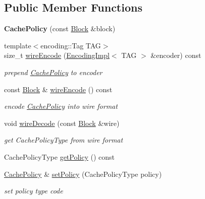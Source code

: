 \subsection*{Public Member Functions}
\begin{DoxyCompactItemize}
\item 
{\bfseries Cache\+Policy} (const \hyperlink{classndn_1_1Block}{Block} \&block)\hypertarget{classndn_1_1lp_1_1CachePolicy_a066e01f298089ce7d2cc9f97b1fdf533}{}\label{classndn_1_1lp_1_1CachePolicy_a066e01f298089ce7d2cc9f97b1fdf533}

\item 
{\footnotesize template$<$encoding\+::\+Tag T\+AG$>$ }\\size\+\_\+t \hyperlink{classndn_1_1lp_1_1CachePolicy_a7b0afe8498c09af9e119ac84868f3100}{wire\+Encode} (\hyperlink{classndn_1_1encoding_1_1EncodingImpl}{Encoding\+Impl}$<$ T\+AG $>$ \&encoder) const
\begin{DoxyCompactList}\small\item\em prepend \hyperlink{classndn_1_1lp_1_1CachePolicy}{Cache\+Policy} to encoder \end{DoxyCompactList}\item 
const \hyperlink{classndn_1_1Block}{Block} \& \hyperlink{classndn_1_1lp_1_1CachePolicy_aaebd5892376df75ac09231f5a0452235}{wire\+Encode} () const\hypertarget{classndn_1_1lp_1_1CachePolicy_aaebd5892376df75ac09231f5a0452235}{}\label{classndn_1_1lp_1_1CachePolicy_aaebd5892376df75ac09231f5a0452235}

\begin{DoxyCompactList}\small\item\em encode \hyperlink{classndn_1_1lp_1_1CachePolicy}{Cache\+Policy} into wire format \end{DoxyCompactList}\item 
void \hyperlink{classndn_1_1lp_1_1CachePolicy_a621d2e6aa2a3ff0315ce4b8f3ccb3b6d}{wire\+Decode} (const \hyperlink{classndn_1_1Block}{Block} \&wire)\hypertarget{classndn_1_1lp_1_1CachePolicy_a621d2e6aa2a3ff0315ce4b8f3ccb3b6d}{}\label{classndn_1_1lp_1_1CachePolicy_a621d2e6aa2a3ff0315ce4b8f3ccb3b6d}

\begin{DoxyCompactList}\small\item\em get Cache\+Policy\+Type from wire format \end{DoxyCompactList}\item 
Cache\+Policy\+Type \hyperlink{classndn_1_1lp_1_1CachePolicy_a3ce8ad339d0bde42c14694a6eeb192e3}{get\+Policy} () const
\item 
\hyperlink{classndn_1_1lp_1_1CachePolicy}{Cache\+Policy} \& \hyperlink{classndn_1_1lp_1_1CachePolicy_af08d8717415125c1bfcc2578c9ca2f15}{set\+Policy} (Cache\+Policy\+Type policy)
\begin{DoxyCompactList}\small\item\em set policy type code \end{DoxyCompactList}\end{DoxyCompactItemize}


